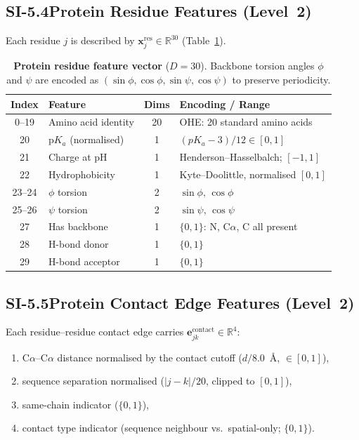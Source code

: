 \documentclass[11pt]{article}
\begin{document}
\subsection*{SI-5.4\quad Protein Residue Features (Level~2)}

Each residue $j$ is described by
$\mathbf{x}_j^{\mathrm{res}} \in \mathbb{R}^{30}$ (Table~\ref{tab:si_prot_feat}).

\begin{table}[H]
\small
\centering
\caption{\textbf{Protein residue feature vector} ($D = 30$).
  Backbone torsion angles $\phi$ and $\psi$ are encoded as
  $(\sin\phi, \cos\phi, \sin\psi, \cos\psi)$ to preserve periodicity.}
\label{tab:si_prot_feat}
\begin{tabular}{clcl}
\toprule
\textbf{Index} & \textbf{Feature} & \textbf{Dims} & \textbf{Encoding / Range} \\
\midrule
0--19  & Amino acid identity     & 20 & OHE: 20 standard amino acids \\
20     & p$K_a$ (normalised)     &  1 & $(pK_a - 3) / 12 \in [0, 1]$ \\
21     & Charge at pH            &  1 & Henderson--Hasselbalch; $[-1, 1]$ \\
22     & Hydrophobicity          &  1 & Kyte--Doolittle, normalised $[0, 1]$ \\
23--24 & $\phi$ torsion          &  2 & $\sin\phi,\, \cos\phi$ \\
25--26 & $\psi$ torsion          &  2 & $\sin\psi,\, \cos\psi$ \\
27     & Has backbone            &  1 & $\{0,1\}$: N, C$\alpha$, C all present \\
28     & H-bond donor            &  1 & $\{0,1\}$ \\
29     & H-bond acceptor         &  1 & $\{0,1\}$ \\
\bottomrule
\end{tabular}
\end{table}

\subsection*{SI-5.5\quad Protein Contact Edge Features (Level~2)}

Each residue--residue contact edge carries
$\mathbf{e}_{jk}^{\mathrm{contact}} \in \mathbb{R}^{4}$:
\begin{enumerate}[leftmargin=1.5em]
  \item C$\alpha$--C$\alpha$ distance normalised by the contact cutoff
    ($d / 8.0$~\AA, $\in [0,1]$),
  \item sequence separation normalised ($|j - k| / 20$, clipped to $[0,1]$),
  \item same-chain indicator ($\{0,1\}$),
  \item contact type indicator (sequence neighbour vs.\ spatial-only; $\{0,1\}$).
\end{enumerate}
\end{document}
